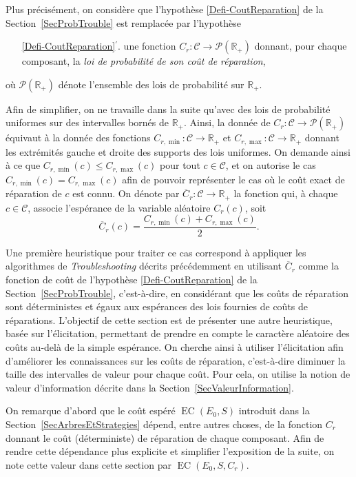\documentclass[a4paper,11pt]{article}
\theoremstyle{plain}
\theoremstyle{definition}
\DeclareMathOperator{\EC}{EC}
\begin{document}
Plus précisément, on considère que l'hypothèse \ref{Defi-CoutReparation} de la Section~\ref{SecProbTrouble} est remplacée par l'hypothèse
\begin{enumerate}
\item[\ref{Defi-CoutReparation}$^\prime$.] une fonction $C_r: \mathcal C \to \mathcal P(\mathbb R_+)$ donnant, pour chaque composant, la \emph{loi de probabilité de son coût de réparation},
\end{enumerate}
où $\mathcal P(\mathbb R_+)$ dénote l'ensemble des lois de probabilité sur $\mathbb R_+$.

Afin de simplifier, on ne travaille dans la suite qu'avec des lois de probabilité uniformes sur des intervalles bornés de $\mathbb R_+$. Ainsi, la donnée de $C_r: \mathcal C \to \mathcal P(\mathbb R_+)$ équivaut à la donnée des fonctions $C_{r, \min}: \mathcal C \to \mathbb R_+$ et $C_{r, \max}: \mathcal C \to \mathbb R_+$ donnant les extrémités gauche et droite des supports des lois uniformes. On demande ainsi à ce que $C_{r, \min}(c) \leq C_{r, \max}(c)$ pour tout $c \in \mathcal C$, et on autorise le cas $C_{r, \min}(c) = C_{r, \max}(c)$ afin de pouvoir représenter le cas où le coût exact de réparation de $c$ est connu. On dénote par $\overline C_r: \mathcal C \to \mathbb R_+$ la fonction qui, à chaque $c \in \mathcal C$, associe l'espérance de la variable aléatoire $C_r(c)$, soit
\[\overline C_r(c) = \frac{C_{r, \min}(c) + C_{r, \max}(c)}{2}.\]

Une première heuristique pour traiter ce cas correspond à appliquer les algorithmes de \emph{Troubleshooting} décrits précédemment en utilisant $\overline C_r$ comme la fonction de coût de l'hypothèse \ref{Defi-CoutReparation} de la Section~\ref{SecProbTrouble}, c'est-à-dire, en considérant que les coûts de réparation sont déterministes et égaux aux espérances des lois fournies de coûts de réparations. L'objectif de cette section est de présenter une autre heuristique, basée sur l'élicitation, permettant de prendre en compte le caractère aléatoire des coûts au-delà de la simple espérance. On cherche ainsi à utiliser l'élicitation afin d'améliorer les connaissances sur les coûts de réparation, c'est-à-dire diminuer la taille des intervalles de valeur pour chaque coût. Pour cela, on utilise la notion de valeur d'information décrite dans la Section~\ref{SecValeurInformation}.

On remarque d'abord que le coût espéré $\EC(E_0, S)$ introduit dans la Section~\ref{SecArbresEtStrategies} dépend, entre autres choses, de la fonction $C_r$ donnant le coût (déterministe) de réparation de chaque composant. Afin de rendre cette dépendance plus explicite et simplifier l'exposition de la suite, on note cette valeur dans cette section par $\EC(E_0, S, C_r)$.
\end{document}
